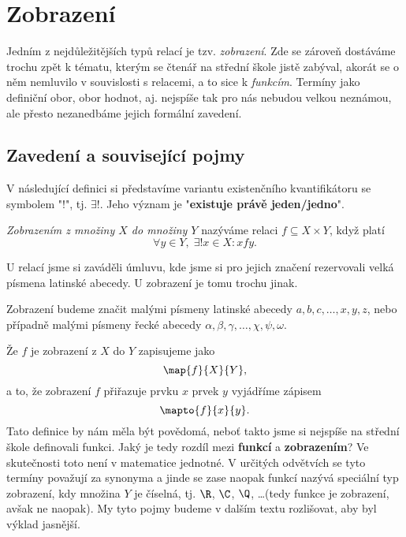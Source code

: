 \section{Zobrazení}\label{sec:zobrazeni}
Jedním z nejdůležitějších typů relací je tzv. \emph{zobrazení}. Zde se zároveň dostáváme trochu zpět k tématu, kterým se čtenář na střední škole jistě zabýval, akorát se o něm nemluvilo v souvislosti s relacemi, a to sice k \emph{funkcím}. Termíny jako definiční obor, obor hodnot, aj. nejspíše tak pro nás nebudou velkou neznámou, ale přesto nezanedbáme jejich formální zavedení.

\subsection{Zavedení a související pojmy}
V následující definici si představíme variantu existenčního kvantifikátoru se symbolem "$!$", tj. $\exists!$. Jeho význam je "\textbf{existuje právě jeden/jedno}".
\begin{definition}[Zobrazení]\label{def:zobrazeni}
    \emph{Zobrazením z množiny $X$ do množiny $Y$} nazýváme relaci $f\subseteq X\times Y$, když platí
    \begin{equation*}
        \forall y\in Y,\; \exists! x\in X : xfy.
    \end{equation*}
\end{definition}
U relací jsme si zaváděli úmluvu, kde jsme si pro jejich značení rezervovali velká písmena latinské abecedy. U zobrazení je tomu trochu jinak.
\begin{convention}
    \sloppy Zobrazení budeme značit malými písmeny latinské abecedy $a,b,c,\dots,x,y,z$, nebo případně malými písmeny řecké abecedy $\alpha,\beta,\gamma,\dots,\chi,\psi,\omega$.
\end{convention}
Že $f$ je zobrazení z $X$ do $Y$ zapisujeme jako
\begin{equation*}
    \map{f}{X}{Y},
\end{equation*}
a to, že zobrazení $f$ přiřazuje prvku $x$ prvek $y$ vyjádříme zápisem
\begin{equation*}
    \mapto{f}{x}{y}.
\end{equation*}
Tato definice by nám měla být povědomá, neboť takto jsme si nejspíše na střední škole definovali funkci. Jaký je tedy rozdíl mezi \textbf{funkcí} a \textbf{zobrazením}? Ve skutečnosti toto není v matematice jednotné. V určitých odvětvích se tyto termíny považují za synonyma a jinde se zase naopak funkcí nazývá speciální typ zobrazení, kdy množina $Y$ je číselná, tj. $\R$, $\C$, $\Q$, \dots (tedy funkce je zobrazení, avšak ne naopak). My tyto pojmy budeme v dalším textu rozlišovat, aby byl výklad jasnější.\par
